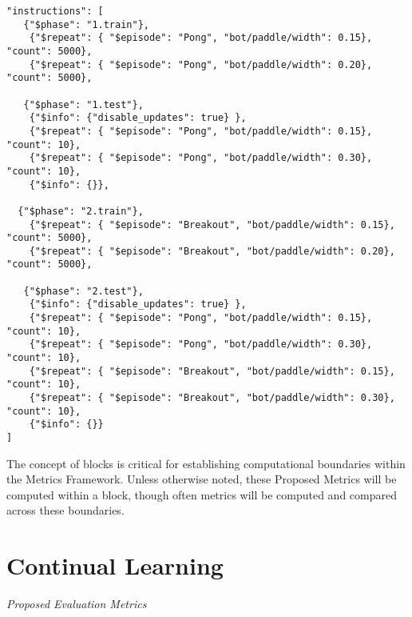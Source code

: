 \begin{small}
\begin{verbatim}
"instructions": [    
   {"$phase": "1.train"}, 
    {"$repeat": { "$episode": "Pong", "bot/paddle/width": 0.15}, "count": 5000}, 
    {"$repeat": { "$episode": "Pong", "bot/paddle/width": 0.20}, "count": 5000}, 

   {"$phase": "1.test"},   
    {"$info": {"disable_updates": true} },
    {"$repeat": { "$episode": "Pong", "bot/paddle/width": 0.15}, "count": 10},  
    {"$repeat": { "$episode": "Pong", "bot/paddle/width": 0.30}, "count": 10},  
    {"$info": {}},
   
  {"$phase": "2.train"}, 
    {"$repeat": { "$episode": "Breakout", "bot/paddle/width": 0.15}, "count": 5000},
    {"$repeat": { "$episode": "Breakout", "bot/paddle/width": 0.20}, "count": 5000}, 

   {"$phase": "2.test"},   
    {"$info": {"disable_updates": true} },
    {"$repeat": { "$episode": "Pong", "bot/paddle/width": 0.15}, "count": 10},
    {"$repeat": { "$episode": "Pong", "bot/paddle/width": 0.30}, "count": 10},
    {"$repeat": { "$episode": "Breakout", "bot/paddle/width": 0.15}, "count": 10},
    {"$repeat": { "$episode": "Breakout", "bot/paddle/width": 0.30}, "count": 10},
    {"$info": {}}
]
\end{verbatim}
\end{small}

The concept of blocks is critical for establishing computational boundaries within the Metrics Framework. Unless otherwise noted, these Proposed Metrics will be computed within a block, though often metrics will be computed and compared across these boundaries.

\section{Continual Learning}

\begin{large}
\textit{Proposed Evaluation Metrics}\\[0.1in]
\end{large}


